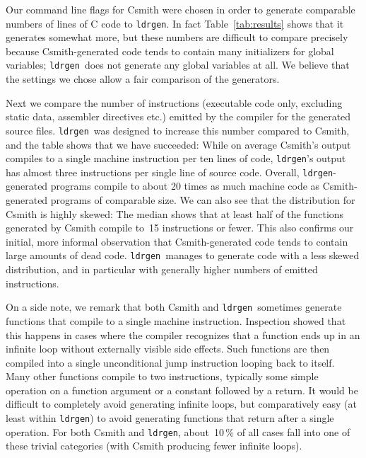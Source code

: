 \documentclass{llncs}
\newcommand\ldrgen{\texttt{ldrgen}}
\begin{document}

Our command line flags for Csmith were chosen in order to generate
comparable numbers of lines of C code to \ldrgen. In fact
Table~\ref{tab:results} shows that it generates somewhat more, but these
numbers are difficult to compare precisely because Csmith-generated code
tends to contain many initializers for global variables; \ldrgen\ does not
generate any global variables at all. We believe that the settings we chose
allow a fair comparison of the generators.

Next we compare the number of instructions (executable code only, excluding
static data, assembler directives etc.) emitted by the compiler for the
generated source files. \ldrgen\ was designed to increase this number
compared to Csmith, and the table shows that we have succeeded: While on
average Csmith's output compiles to a single machine instruction per ten
lines of code, \ldrgen's output has almost three instructions per single
line of source code. Overall, \ldrgen-generated programs compile to about 20
times as much machine code as Csmith-generated programs of comparable size.
We can also see that the distribution for Csmith is highly skewed: The
median shows that at least half of the functions generated by Csmith compile
to~15 instructions or fewer. This also confirms our initial, more informal
observation that Csmith-generated code tends to contain large amounts of
dead code. \ldrgen\ manages to generate code with a less skewed
distribution, and in particular with generally higher numbers of emitted
instructions.

On a side note, we remark that both Csmith and \ldrgen\ sometimes generate
functions that compile to a single machine instruction. Inspection showed
that this happens in cases where the compiler recognizes that a function
ends up in an infinite loop without externally visible side effects. Such
functions are then compiled into a single unconditional jump instruction
looping back to itself. Many other functions compile to two instructions,
typically some simple operation on a function argument or a constant
followed by a return. It would be difficult to completely avoid generating
infinite loops, but comparatively easy (at least within \ldrgen) to avoid
generating functions that return after a single operation. For both Csmith
and \ldrgen, about~10\,\% of all cases fall into one of these trivial
categories (with Csmith producing fewer infinite loops).
\end{document}
